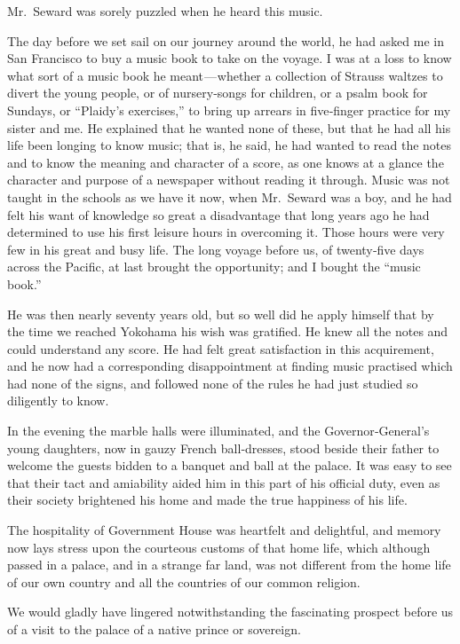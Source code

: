 \documentclass[12pt]{book}
\begin{document}
Mr.~Seward was sorely puzzled when he heard this music.

The day before we set sail on our journey around the world, he had asked
me in San Francisco to buy a music book to take on the voyage. I was at a loss
to know what sort of a music book he meant — whether a collection of Strauss
waltzes to divert the young people, or of nursery‐songs for children, or a psalm
book for Sundays, or “Plaidy’s exercises,” to bring up arrears in five‐finger practice
for my sister and me. He explained that he wanted none of these, but that he had
all his life been longing to know music; that is, he said, he had wanted to read the
notes and to know the meaning and character of a score, as one knows at a glance
the character and purpose of a newspaper without reading it through. Music was
not taught in the schools as we have it now, when Mr.~Seward was a boy, and he
had felt his want of knowledge so great a disadvantage that long years ago he
had determined to use his first leisure hours in overcoming it. Those hours were
very few in his great and busy life. The long voyage before us, of twenty‐five days
across the Pacific, at last brought the opportunity; and I bought the “music book.”

He was then nearly seventy years old, but so well did he apply himself that by
the time we reached Yokohama his wish was gratified. He knew all the notes and
could understand any score. He had felt great satisfaction in this acquirement, and
he now had a corresponding disappointment at finding music practised which had
none of the signs, and followed none of the rules he had just studied so diligently
to know.

In the evening the marble halls were illuminated, and the Governor‐General’s
young daughters, now in gauzy French ball‐dresses, stood beside their father to
welcome the guests bidden to a banquet and ball at the palace. It was easy to see
that their tact and amiability aided him in this part of his official duty, even as
their society brightened his home and made the true happiness of his life.

The hospitality of Government House was heartfelt and delightful, and memory now lays stress upon the courteous customs of that home life, which although
passed in a palace, and in a strange far land, was not different from the home life
of our own country and all the countries of our common religion.

We would gladly have lingered notwithstanding the fascinating prospect
before us of a visit to the palace of a native prince or sovereign.
\end{document}
